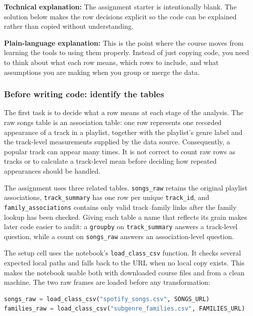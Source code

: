 \documentclass[11pt,a4paper]{article}
\begin{document}
\textbf{Technical explanation:} The assignment starter is intentionally blank. The solution below makes the row decisions explicit so the code can be explained rather than copied without understanding.

\textbf{Plain-language explanation:} This is the point where the course moves from learning the tools to using them properly. Instead of just copying code, you need to think about what each row means, which rows to include, and what assumptions you are making when you group or merge the data.

\subsubsection{Before writing code: identify the tables}
The first task is to decide what a row means at each stage of the analysis. The raw songs table is an association table: one row represents one recorded appearance of a track in a playlist, together with the playlist's genre label and the track-level measurements supplied by the data source. Consequently, a popular track can appear many times. It is not correct to count raw rows as tracks or to calculate a track-level mean before deciding how repeated appearances should be handled.

The assignment uses three related tables. \texttt{songs\_raw} retains the original playlist associations, \texttt{track\_summary} has one row per unique \texttt{track\_id}, and \texttt{family\_associations} contains only valid track--family links after the family lookup has been checked. Giving each table a name that reflects its grain makes later code easier to audit: a \texttt{groupby} on \texttt{track\_summary} answers a track-level question, while a count on \texttt{songs\_raw} answers an association-level question.

The setup cell uses the notebook's \texttt{load\_class\_csv} function. It checks several expected local paths and falls back to the URL when no local copy exists. This makes the notebook usable both with downloaded course files and from a clean machine. The two raw frames are loaded before any transformation:

\begin{lstlisting}[language=python]
songs_raw = load_class_csv("spotify_songs.csv", SONGS_URL)
families_raw = load_class_csv("subgenre_families.csv", FAMILIES_URL)
\end{lstlisting}
\end{document}
